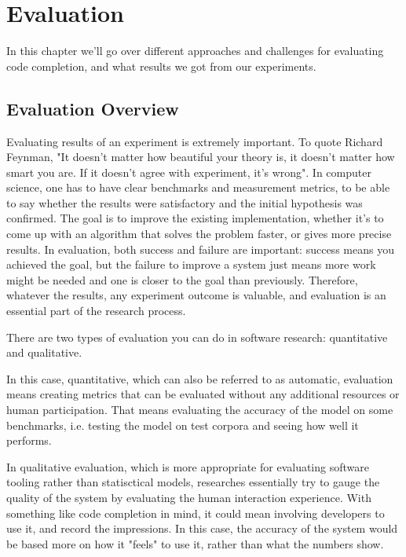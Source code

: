 \chapter{Evaluation}
\label{chap:Evaluation}

In this chapter we'll go over different approaches and challenges for evaluating code completion, and what results we got from our experiments.

\section{Evaluation Overview}
\label{sec:Evaluation-Overview}
Evaluating results of an experiment is extremely important. To quote Richard Feynman, "It doesn't matter how beautiful your theory is, it doesn't matter how smart you are. If it doesn't agree with experiment, it's wrong". In computer science, one has to have clear benchmarks and measurement metrics, to be able to say whether the results were satisfactory and the initial hypothesis was confirmed. The goal is to improve the existing implementation, whether it's to come up with an algorithm that solves the problem faster, or gives more precise results. In evaluation, both success and failure are important: success means you achieved the goal, but the failure to improve a system just means more work might be needed and one is closer to the goal than previously. Therefore, whatever the results, any experiment outcome is valuable, and evaluation is an essential part of the research process.

There are two types of evaluation you can do in software research: quantitative and qualitative.

In this case, quantitative, which can also be referred to as automatic, evaluation means creating metrics that can be evaluated without any additional resources or human participation. That means evaluating the accuracy of the model on some benchmarks, i.e. testing the model on test corpora and seeing how well it performs.

In qualitative evaluation, which is more appropriate for evaluating software tooling rather than statisctical models, researches essentially try to gauge the quality of the system by evaluating the human interaction experience. With something like code completion in mind, it could mean involving developers to use it, and record the impressions. In this case, the accuracy of the system would be based more on how it "feels" to use it, rather than what the numbers show.

